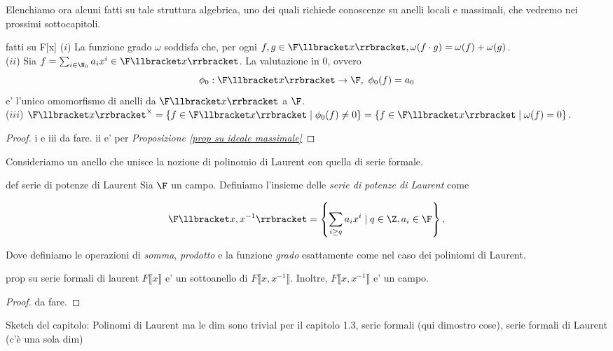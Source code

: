 \noindent Elenchiamo ora alcuni fatti su tale struttura algebrica, uno dei quali richiede conoscenze su anelli locali e massimali, 
che vedremo nei prossimi sottocapitoli.

\begin{lem}[]{fatti su F[x]}
  ($i$) La funzione grado $\omega$ soddisfa che, per ogni $f, g \in \F\llbracket x \rrbracket, \omega(f\cdot g) = \omega(f) + \omega(g)$. \\
  \noindent ($ii$) Sia $f = \sum_{i\in \N_0} a_i x^i \in \F\llbracket x \rrbracket$. La valutazione in 0, ovvero
      \[ \phi_0 : \F\llbracket x \rrbracket \rightarrow \F,\ \phi_0(f) = a_0 \]
    \noindent e' l'unico omomorfismo di anelli da $\F\llbracket x \rrbracket$ a $\F$.\\
  \noindent ($iii$) $\F\llbracket x \rrbracket^{\times} = \{ f \in \F\llbracket x \rrbracket \mid \phi_0(f) \neq 0 \} 
    = \{ f \in \F\llbracket x \rrbracket \mid \omega(f) = 0 \}$.
 
\end{lem}
\begin{proof}
  i e iii da fare. ii e' per \emph{Proposizione \ref{prop su ideale massimale}}
\end{proof}

\noindent Consideriamo un anello che unisce la nozione di polinomio di Laurent con quella di serie formale.

\begin{defn}{def serie di potenze di Laurent}
  Sia $\F$ un campo. Definiamo l'insieme delle \emph{serie di potenze di Laurent} come 

  \[ \F\llbracket x, x^{-1} \rrbracket = \left\{ \sum\limits_{i \geq q} a_i x^i \mid q \in \Z, a_i \in \F \right\}, \]

  \noindent Dove definiamo le operazioni di \emph{somma}, \emph{prodotto} e la funzione \emph{grado} esattamente come nel caso
  dei poliniomi di Laurent.
\end{defn}

\begin{lem}[]{prop su serie formali di laurent}
  $F\llbracket x \rrbracket$ e' un sottoanello di $F\llbracket x, x^{-1} \rrbracket$. Inoltre, $F\llbracket x, x^{-1} \rrbracket$ e' un campo.
\end{lem}
\begin{proof}
  da fare.
\end{proof}


\noindent Sketch del capitolo: Polinomi di Laurent ma le dim sono trivial per il capitolo 1.3, serie formali (qui dimostro cose), 
serie formali di Laurent (c'è una sola dim)

\clearpage